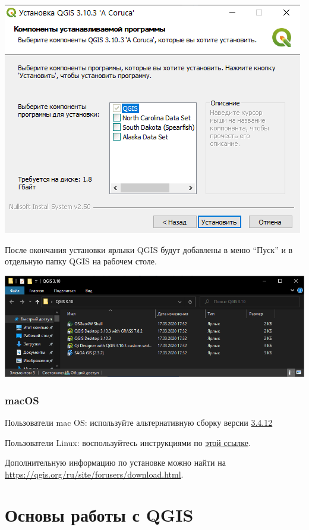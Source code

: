 \documentclass[
  12pt,
]{book}
\begin{document}
\includegraphics{images/installation_instruction_win/win04.png}

После окончания установки ярлыки QGIS будут добавлены в меню ``Пуск'' и в отдельную папку QGIS на рабочем столе.

\includegraphics{images/installation_instruction_win/win05.png}

\hypertarget{macos}{%
\section*{macOS}\label{macos}}

Пользователи mac OS: используйте альтернативную сборку версии \href{https://www.kyngchaos.com/files/software/qgis/QGIS-macOS-3.4.12-1.dmg}{3.4.12}

Пользователи Linux: воспользуйтесь инструкциями по \href{https://qgis.org/ru/site/forusers/alldownloads.html\#linux}{этой ссылке}.

Дополнительную информацию по установке можно найти на \url{https://qgis.org/ru/site/forusers/download.html}.

\hypertarget{part-ux43eux441ux43dux43eux432ux44b-ux440ux430ux431ux43eux442ux44b-ux441-qgis}{%
\part{Основы работы с QGIS}\label{part-ux43eux441ux43dux43eux432ux44b-ux440ux430ux431ux43eux442ux44b-ux441-qgis}}
\end{document}
